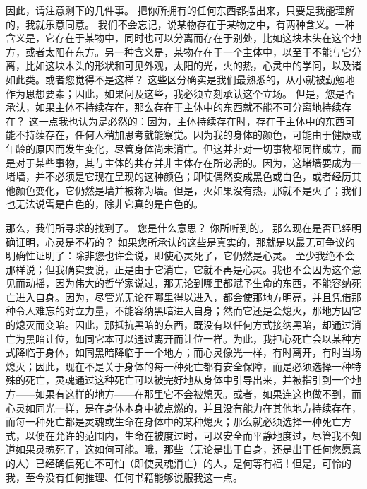  因此，请注意剩下的几件事。 把你所拥有的任何东西都摆出来，只要是我能理解的，我就乐意同意。 我们不会忘记，说某物存在于某物之中，有两种含义。一种含义是，它存在于某物中，同时也可以分离而存在于别处，比如这块木头在这个地方，或者太阳在东方。另一种含义是，某物存在于一个主体中，以至于不能与它分离，比如这块木头的形状和可见外观，太阳的光，火的热，心灵中的学问，以及诸如此类。或者您觉得不是这样？ 这些区分确实是我们最熟悉的，从小就被勤勉地作为思想要素；因此，如果问及这些，我必须立刻承认这个立场。 但是，您是否承认，如果主体不持续存在，那么存在于主体中的东西就不能不可分离地持续存在？ 这一点我也认为是必然的：因为，主体持续存在时，存在于主体中的东西可能不持续存在，任何人稍加思考就能察觉。因为我的身体的颜色，可能由于健康或年龄的原因而发生变化，尽管身体尚未消亡。但这并非对一切事物都同样成立，而是对于某些事物，其与主体的共存并非主体存在所必需的。因为，这堵墙要成为一堵墙，并不必须是它现在呈现的这种颜色；即使偶然变成黑色或白色，或者经历其他颜色变化，它仍然是墙并被称为墙。但是，火如果没有热，那就不是火了；我们也无法说雪是白色的，除非它真的是白色的。\par

 那么，我们所寻求的找到了。 您是什么意思？ 你所听到的。 那么现在是否已经明确证明，心灵是不朽的？ 如果您所承认的这些是真实的，那就是以最无可争议的明确性证明了：除非您也许会说，即使心灵死了，它仍然是心灵。 至少我绝不会那样说；但我确实要说，正是由于它消亡，它就不再是心灵。我也不会因为这个意见而动摇，因为伟大的哲学家说过，那无论到哪里都赋予生命的东西，不能容纳死亡进入自身。因为，尽管光无论在哪里得以进入，都会使那地方明亮，并且凭借那种令人难忘的对立力量，不能容纳黑暗进入自身；然而它还是会熄灭，那地方因它的熄灭而变暗。因此，那抵抗黑暗的东西，既没有以任何方式接纳黑暗，却通过消亡为黑暗让位，如同它本可以通过离开而让位一样。为此，我担心死亡会以某种方式降临于身体，如同黑暗降临于一个地方；而心灵像光一样，有时离开，有时当场熄灭；因此，现在不是关于身体的每一种死亡都有安全保障，而是必须选择一种特殊的死亡，灵魂通过这种死亡可以被完好地从身体中引导出来，并被指引到一个地方——如果有这样的地方——在那里它不会被熄灭。或者，如果连这也做不到，而心灵如同光一样，是在身体本身中被点燃的，并且没有能力在其他地方持续存在，而每一种死亡都是灵魂或生命在身体中的某种熄灭；那么就必须选择一种死亡方式，以便在允许的范围内，生命在被度过时，可以安全而平静地度过，尽管我不知道如果灵魂死了，这如何可能。哦，那些（无论是出于自身，还是出于任何您愿意的人）已经确信死亡不可怕（即使灵魂消亡）的人，是何等有福！但是，可怜的我，至今没有任何推理、任何书籍能够说服我这一点。\par

